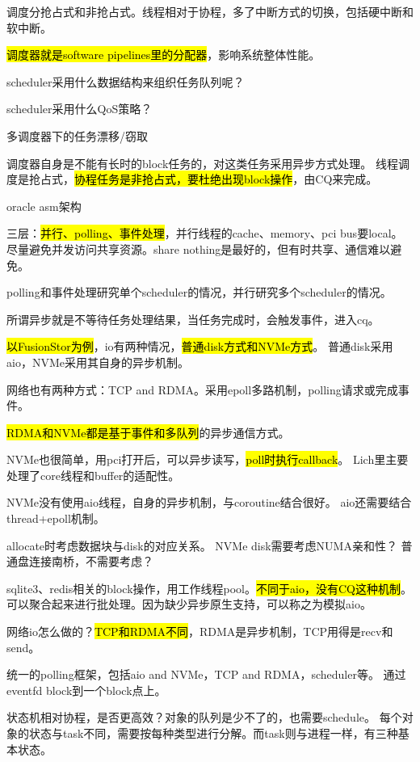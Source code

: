 调度分抢占式和非抢占式。线程相对于协程，多了中断方式的切换，包括硬中断和软中断。

\hl{调度器就是software pipelines里的分配器}，影响系统整体性能。

scheduler采用什么数据结构来组织任务队列呢？

scheduler采用什么QoS策略？

多调度器下的任务漂移/窃取

调度器自身是不能有长时的block任务的，对这类任务采用异步方式处理。
线程调度是抢占式，\hl{协程任务是非抢占式，要杜绝出现block操作}，由CQ来完成。

oracle asm架构

三层：\hl{并行、polling、事件处理}，并行线程的cache、memory、pci bus要local。
尽量避免并发访问共享资源。share nothing是最好的，但有时共享、通信难以避免。

polling和事件处理研究单个scheduler的情况，并行研究多个scheduler的情况。

\hrulefill

所谓异步就是不等待任务处理结果，当任务完成时，会触发事件，进入cq。

\hl{以FusionStor为例}，io有两种情况，\hl{普通disk方式和NVMe方式}。
普通disk采用aio，NVMe采用其自身的异步机制。

网络也有两种方式：TCP and RDMA。采用epoll多路机制，polling请求或完成事件。

\hl{RDMA和NVMe都是基于事件和多队列}的异步通信方式。

NVMe也很简单，用pci打开后，可以异步读写，\hl{poll时执行callback}。
Lich里主要处理了core线程和buffer的适配性。

NVMe没有使用aio线程，自身的异步机制，与coroutine结合很好。
aio还需要结合thread+epoll机制。

allocate时考虑数据块与disk的对应关系。
NVMe disk需要考虑NUMA亲和性？
普通盘连接南桥，不需要考虑？

sqlite3、redis相关的block操作，用工作线程pool。\hl{不同于aio，没有CQ这种机制}。
可以聚合起来进行批处理。因为缺少异步原生支持，可以称之为模拟aio。

网络io怎么做的？\hl{TCP和RDMA不同}，RDMA是异步机制，TCP用得是recv和send。

统一的polling框架，包括aio and NVMe，TCP and RDMA，scheduler等。
通过eventfd block到一个block点上。

\hrulefill

状态机相对协程，是否更高效？对象的队列是少不了的，也需要schedule。
每个对象的状态与task不同，需要按每种类型进行分解。而task则与进程一样，有三种基本状态。


